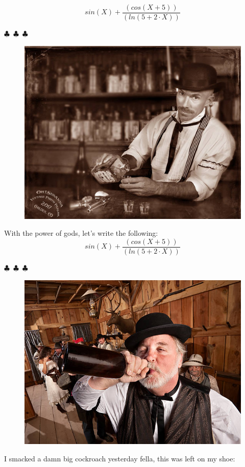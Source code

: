 \documentclass{article}
\begin{document}
\begin{equation}
{{sin({X})}+{\frac{({cos({{X}+{5}})})}{({ln({{5}+{{2}\cdot{X}}})})}}}
\end{equation}
\begin{center} $\clubsuit$~$\clubsuit$~$\clubsuit$ \end{center}\begin{figure}[H] \includegraphics[scale=0.3]{funny_pics/bartender.jpg} \end{figure} With the power of gods, let's write the following: 
\begin{equation}
{{sin({X})}+{\frac{({cos({{X}+{5}})})}{({ln({{5}+{{2}\cdot{X}}})})}}}
\end{equation}
\begin{center} $\clubsuit$~$\clubsuit$~$\clubsuit$ \end{center}\begin{figure}[H] \includegraphics[scale=1.4]{funny_pics/drunk_cowboy.jpg} \end{figure} I smacked a damn big cockroach yesterday fella, this was left on my shoe: 
\end{document}
